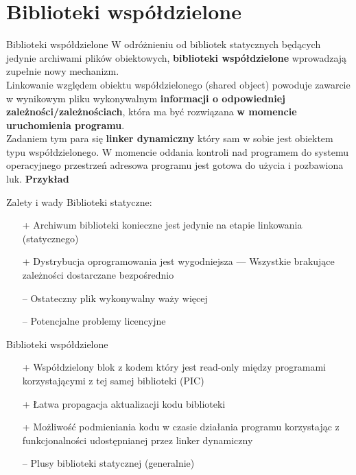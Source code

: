 \section{Biblioteki współdzielone}
\begin{frame}{Biblioteki współdzielone}
  W odróżnieniu od bibliotek statycznych będących jedynie archiwami plików
  obiektowych, \textbf{biblioteki współdzielone} wprowadzają zupełnie nowy mechanizm.\\
  
  Linkowanie względem obiektu współdzielonego (shared object) powoduje zawarcie
  w wynikowym pliku wykonywalnym \textbf{informacji o odpowiedniej
    zależności/zależnościach}, która ma
  być rozwiązana \textbf{w momencie uruchomienia programu}.\\

  Zadaniem tym para się \textbf{linker dynamiczny} który sam w sobie jest
  obiektem typu współdzielonego. W momencie oddania kontroli nad programem do
  systemu operacyjnego przestrzeń adresowa programu jest gotowa do użycia i
  pozbawiona luk. \textbf{Przykład}
\end{frame}
\begin{frame}{Zalety i wady}
  Biblioteki statyczne:
  \begin{itemize}
  \item[+] Archiwum biblioteki konieczne jest jedynie na etapie linkowania
    (statycznego)
  \item[+] Dystrybucja oprogramowania jest wygodniejsza --- Wszystkie brakujące
    zależności dostarczane bezpośrednio
  \item[--] Ostateczny plik wykonywalny waży więcej
  \item[--] Potencjalne problemy licencyjne
  \end{itemize}
  Biblioteki współdzielone
  \begin{itemize}
  \item[+] Współdzielony blok z kodem który jest read-only między programami
    korzystającymi z tej samej biblioteki (PIC)
  \item[+] Łatwa propagacja aktualizacji kodu biblioteki
  \item[+] Możliwość podmieniania kodu w czasie działania programu korzystając z
    funkcjonalności udostępnianej przez linker dynamiczny
  \item[--] Plusy biblioteki statycznej (generalnie)
  \end{itemize}
\end{frame}
